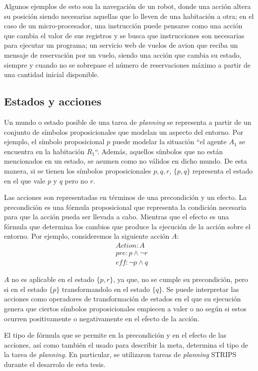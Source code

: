 Algunos ejemplos de esto son la navegación de un robot, donde una acción altera
su posición siendo necesarias aquellas que lo lleven de una habitación a otra;
en el caso de un micro-procesador, una instrucción puede pensarse como una
acción que cambia el valor de sus registros y se busca que instrucciones son
necesarias para ejecutar un programa; un servicio web de vuelos de avion que
reciba un mensaje de reservación por un vuelo, siendo una acción que cambia su
estado, siempre y cuando no se sobrepase el número de reservaciones máximo a
partir de una cantidad inicial disponible. \citep{Sandewall-2008-HandbookOK}

\subsection{Estados y acciones}

Un mundo o estado  posible de una tarea de \emph{planning} se representa a
partir de un conjunto de símbolos proposicionales que modelan un aspecto del
entorno. Por ejemplo, el símbolo proposicional $p$ puede modelar la situación
``el agente $A_1$ se encuentra en la habitación $R_1$``. Además, aquellos
símbolos  que no están mencionados en un estado, se asumen como no válidos en
dicho mundo. De esta manera, si se tienen los símbolos proposicionales $p,q,r$,
$\{p, q\}$ representa el estado en el que vale $p$ y $q$ pero no $r$.

Las acciones son representadas en términos de una precondición y un efecto. La
precondición es una fórmula proposicional que representa la condición necesaria
para que la acción pueda ser llevada a cabo. Mientras que el efecto es una
fórmula que determina los cambios que produce la ejecución de la acción sobre el
entorno. Por ejemplo, consideremos la siguiente acción $A$:
\begin{align*}
    & Action : A \\
    & pre : p \land \neg r \\
    & eff : \neg p \land q
\end{align*}

$A$ no es aplicable en el estado $\{p, r\}$, ya que, no se cumple su
precondición, pero si en el estado $\{p\}$ transformandolo en el estado $\{q\}$. Se puede interpretar las acciones como operadores de transformación de
estados en el que su ejecución genera que ciertos símbolos proposicionales
empiecen a valer o no según si estos ocurren positivamente o negativamente en el
efecto de la acción.

El tipo de fórmula que se permite en la precondición y en el efecto de las
acciones, así como también el usado para describir la meta, determina el tipo de
la tarea de \emph{planning}. En particular, se utilizaron tareas de
\emph{planning} STRIPS durante el desarrolo de esta tesis.

